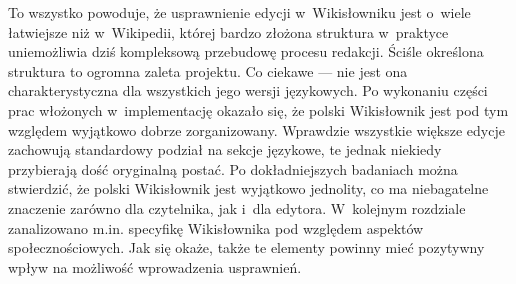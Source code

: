 To wszystko powoduje, że usprawnienie edycji w~Wikisłowniku jest o~wiele łatwiejsze niż w~Wikipedii, której bardzo złożona struktura w~praktyce uniemożliwia dziś kompleksową przebudowę procesu redakcji. Ściśle określona struktura to ogromna zaleta projektu. Co ciekawe --- nie jest ona charakterystyczna dla wszystkich jego wersji językowych. Po wykonaniu części prac włożonych w~implementację okazało się, że polski Wikisłownik jest pod tym względem wyjątkowo dobrze zorganizowany. Wprawdzie wszystkie większe edycje zachowują standardowy podział na sekcje językowe, te jednak niekiedy przybierają dość oryginalną postać. Po dokładniejszych badaniach można stwierdzić, że polski Wikisłownik jest wyjątkowo jednolity, co ma niebagatelne znaczenie zarówno dla czytelnika, jak i~dla edytora. W~kolejnym rozdziale zanalizowano m.in. specyfikę Wikisłownika pod względem aspektów społecznościowych. Jak się okaże, także te elementy powinny mieć pozytywny wpływ na możliwość wprowadzenia usprawnień.
